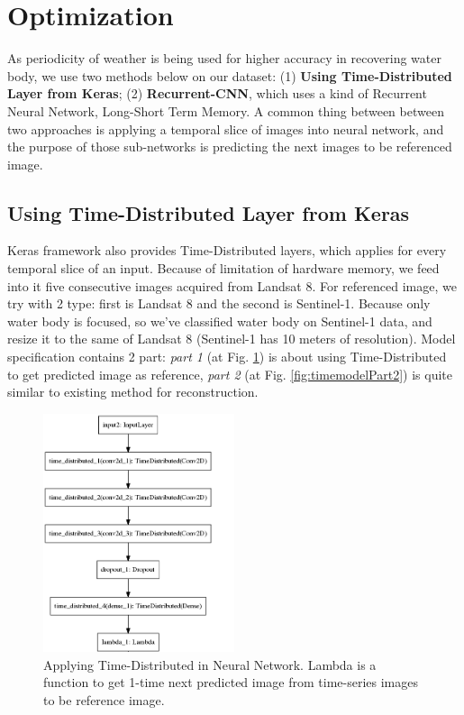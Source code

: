 \section{Optimization}

As periodicity of weather is being used for higher accuracy in recovering water body, we use two methods below on our dataset: (1) \textbf{Using Time-Distributed Layer from Keras}; (2) \textbf{Recurrent-CNN}, which uses a kind of Recurrent Neural Network, Long-Short Term Memory. A common thing between between two approaches is applying a temporal slice of images into neural network, and the purpose of those sub-networks is predicting the next images to be referenced image. 

\subsection{Using Time-Distributed Layer from Keras}

Keras framework also provides Time-Distributed layers, which applies for every temporal slice of an input. Because of limitation of hardware memory, we feed into it five consecutive images acquired from Landsat 8. For referenced image, we try with 2 type: first is Landsat 8 and the second is Sentinel-1. Because only water body is focused, so we've classified water body on Sentinel-1 data, and resize it to the same of Landsat 8 (Sentinel-1 has 10 meters of resolution). Model specification contains 2 part: \textit{part 1}  (at Fig. \ref{fig:timemodelPart1}) is about using Time-Distributed to get predicted image as reference, \textit{part 2} (at Fig. \ref{fig:timemodelPart2}) is quite similar to existing method for reconstruction.

\begin{figure}[h!]
	\centering
	\includegraphics[width=0.5\textwidth]{figures/timemodelPart1.png}
	\caption{Applying Time-Distributed in Neural Network. Lambda is a function to get 1-time next predicted image from time-series images to be reference image.}
	\label{fig:timemodelPart1}
\end{figure}

